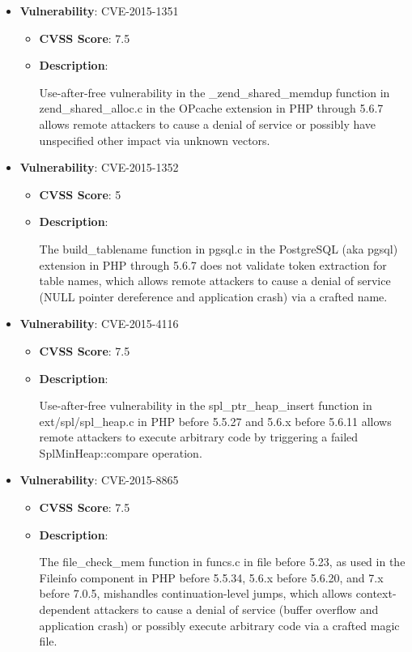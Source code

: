 \documentclass{article}
\begin{document}
\begin{itemize}
        \item \textbf{Vulnerability}: CVE-2015-1351
        \begin{itemize}
            \item \textbf{CVSS Score}:  7.5 
            \item \textbf{Description}:
            \parbox[t]{0.9\linewidth}{
                \ttfamily Use-after-free vulnerability in the \_zend\_shared\_memdup function in zend\_shared\_alloc.c in the OPcache extension in PHP through 5.6.7 allows remote attackers to cause a denial of service or possibly have unspecified other impact via unknown vectors.
            }
        \end{itemize}
    
        \item \textbf{Vulnerability}: CVE-2015-1352
        \begin{itemize}
            \item \textbf{CVSS Score}:  5 
            \item \textbf{Description}:
            \parbox[t]{0.9\linewidth}{
                \ttfamily The build\_tablename function in pgsql.c in the PostgreSQL (aka pgsql) extension in PHP through 5.6.7 does not validate token extraction for table names, which allows remote attackers to cause a denial of service (NULL pointer dereference and application crash) via a crafted name.
            }
        \end{itemize}
    
        \item \textbf{Vulnerability}: CVE-2015-4116
        \begin{itemize}
            \item \textbf{CVSS Score}:  7.5 
            \item \textbf{Description}:
            \parbox[t]{0.9\linewidth}{
                \ttfamily Use-after-free vulnerability in the spl\_ptr\_heap\_insert function in ext/spl/spl\_heap.c in PHP before 5.5.27 and 5.6.x before 5.6.11 allows remote attackers to execute arbitrary code by triggering a failed SplMinHeap::compare operation.
            }
        \end{itemize}
    
        \item \textbf{Vulnerability}: CVE-2015-8865
        \begin{itemize}
            \item \textbf{CVSS Score}:  7.5 
            \item \textbf{Description}:
            \parbox[t]{0.9\linewidth}{
                \ttfamily The file\_check\_mem function in funcs.c in file before 5.23, as used in the Fileinfo component in PHP before 5.5.34, 5.6.x before 5.6.20, and 7.x before 7.0.5, mishandles continuation-level jumps, which allows context-dependent attackers to cause a denial of service (buffer overflow and application crash) or possibly execute arbitrary code via a crafted magic file.
            }
        \end{itemize}
    

\end{itemize}
\end{document}
